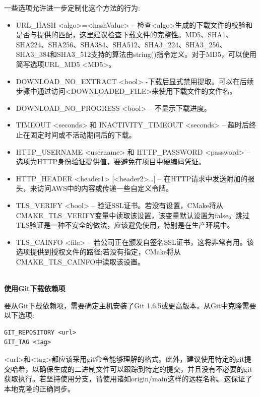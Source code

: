 一些选项允许进一步定制化这个方法的行为:

\begin{itemize}
\item 
URL\_HASH <algo>=<hashValue> – 检查<algo>生成的下载文件的校验和是否与提供的匹配，这里建议检查下载文件的完整性。MD5、SHA1、SHA224、SHA256、SHA384、SHA512、SHA3\_224、SHA3\_256、SHA3\_384和SHA3\_512支持的算法由string()指令定义。对于MD5，可以使用简写选项URL\_MD5 <MD5>。

\item 
DOWNLOAD\_NO\_EXTRACT <bool> -下载后显式禁用提取。可以在后续步骤中通过访问<DOWNLOADED\_FILE>来使用下载文件的文件名。

\item 
DOWNLOAD\_NO\_PROGRESS <bool> – 不显示下载进度。

\item 
TIMEOUT <seconds> 和 INACTIVITY\_TIMEOUT <seconds> – 超时后终止在固定时间或不活动期间后的下载。

\item 
HTTP\_USERNAME <username> 和 HTTP\_PASSWORD <password> – 选项为HTTP身份验证提供值，要避免在项目中硬编码凭证。

\item 
HTTP\_HEADER <header1> [<header2>…] – 在HTTP请求中发送附加的报头，来访问AWS中的内容或传递一些自定义令牌。

\item 
TLS\_VERIFY <bool> – 验证SSL证书。若没有设置，CMake将从CMAKE\_TLS\_VERIFY变量中读取该设置，该变量默认设置为false。跳过TLS验证是一种不安全的做法，应该避免使用，特别是在生产环境中。

\item 
TLS\_CAINFO <file> – 若公司正在颁发自签名SSL证书，这将非常有用。该选项提供到授权文件的路径;若没有指定，CMake将从CMAKE\_TLS\_CAINFO中读取该设置。
\end{itemize}

\hspace*{\fill} \\ %
\noindent
\textbf{使用Git下载依赖项}

要从Git下载依赖项，需要确定主机安装了Git 1.6.5或更高版本。从Git中克隆需要以下选项:

\begin{lstlisting}[style=styleCMake]
GIT_REPOSITORY <url>
GIT_TAG <tag>
\end{lstlisting} 

<url>和<tag>都应该采用git命令能够理解的格式。此外，建议使用特定的git提交哈希，以确保生成的二进制文件可以跟踪到特定的提交，并且没有不必要的git获取执行。若坚持使用分支，请使用诸如origin/main这样的远程名称。这保证了本地克隆的正确同步。

